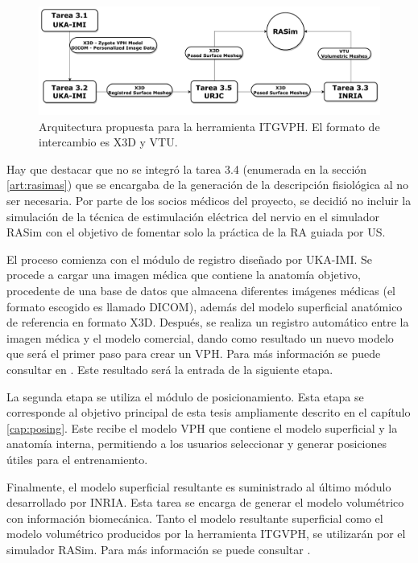 \begin{figure}
    \centering
    \includegraphics[width=1\textwidth]{IMG/DiagramaITGVPH.pdf}
    \caption{Arquitectura propuesta para la herramienta \acs{ITGVPH}. El formato de intercambio es \acs{X3D} y \acs{VTU}.}
    \label{fig:toolarq}
\end{figure}

Hay que destacar que no se integró  la tarea 3.4 (enumerada en la sección \ref{art:rasimas}) que se encargaba de la generación de la descripción fisiológica al no ser necesaria. Por parte de los socios médicos del proyecto, se decidió no incluir la simulación de la técnica de estimulación eléctrica del nervio en el simulador \ac{RASim} con el objetivo de  fomentar solo la práctica de la \ac{RA} guiada por \ac{US}.

El proceso comienza con el módulo de registro diseñado por \ac{UKA-IMI}. Se procede a cargar una imagen médica que contiene la anatomía objetivo, procedente de una base de datos que almacena diferentes imágenes médicas (el formato escogido es llamado \acs{DICOM}), además del modelo superficial anatómico de referencia en formato \ac{X3D}. Después, se realiza un registro automático entre la imagen médica y el modelo comercial, dando como resultado un nuevo modelo que será el primer paso para crear un \ac{VPH}. Para más información se puede consultar en \cite{deOliveira:2015}. Este resultado será la entrada de la siguiente etapa.

La segunda etapa se utiliza el módulo de posicionamiento. Esta etapa se corresponde al objetivo principal de esta tesis ampliamente descrito en el capítulo \ref{cap:posing}. Este recibe el modelo \ac{VPH} que contiene el modelo superficial y la anatomía interna, permitiendo a los usuarios seleccionar y generar posiciones útiles para el entrenamiento.

Finalmente, el modelo superficial resultante es suministrado al último módulo desarrollado por \ac{INRIA}. Esta tarea se encarga de generar el modelo volumétrico con  información biomecánica.
Tanto el modelo resultante superficial como el modelo volumétrico producidos por la herramienta \ac{ITGVPH}, se utilizarán por el simulador \ac{RASim}. Para más información se puede consultar \cite{ded3.3}.



